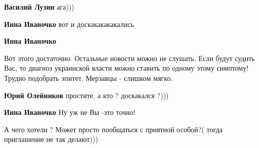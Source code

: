 \begin{itemize}
\begin{itemize}
\textbf{Василий Лузин} ага)))

 
\textbf{Инна Иваночко} вот и доскакакакакались\Laughey[1.0][white]

 
\textbf{Инна Иваночко} 

Вот этого достаточно. Остальные новости можно не слушать. Если будут судить
Вас, то диагноз украинской власти можно ставить по одному этому симптому!
Трудно подобрать эпитет. Мерзавцы - слишком мягко.



 
\textbf{Юрий Олейников} простите, а кто ? доскакался ?)))

 
\textbf{Инна Иваночко} Ну уж не Вы -это точно!
\end{itemize}

 
А чего хотели ? Может просто пообщаться с приятной особой?( тогда приглашение не так делают)))

 

\end{itemize}
